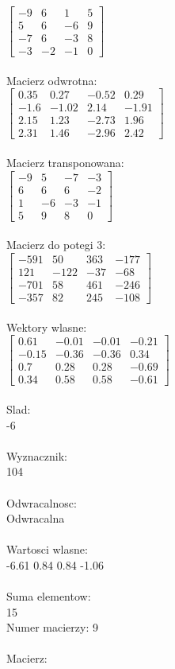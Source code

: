 \documentclass[a4paper,12pt]{article}
\begin{document}
$\begin{bmatrix} -9&6&1&5\\5&6&-6&9\\-7&6&-3&8\\-3&-2&-1&0 \end{bmatrix}$
\\
\\
Macierz odwrotna:\\

$\begin{bmatrix} 0.35&0.27&-0.52&0.29\\-1.6&-1.02&2.14&-1.91\\2.15&1.23&-2.73&1.96\\2.31&1.46&-2.96&2.42 \end{bmatrix}$
\\
\\
Macierz transponowana:\\

$\begin{bmatrix} -9&5&-7&-3\\6&6&6&-2\\1&-6&-3&-1\\5&9&8&0 \end{bmatrix}$
\\
\\
Macierz do potegi 3:\\

$\begin{bmatrix} -591&50&363&-177\\121&-122&-37&-68\\-701&58&461&-246\\-357&82&245&-108 \end{bmatrix}$
\\
\\
Wektory wlasne:\\

$\begin{bmatrix} 0.61&-0.01&-0.01&-0.21\\-0.15&-0.36&-0.36&0.34\\0.7&0.28&0.28&-0.69\\0.34&0.58&0.58&-0.61 \end{bmatrix}$
\\
\\
Slad:\\
-6
\\
\\
Wyznacznik:\\
104
\\
\\
Odwracalnosc:\\
Odwracalna
\\
\\
Wartosci wlasne:\\
-6.61 0.84 0.84 -1.06
\\
\\
Suma elementow:\\
15
\\
\newpage
Numer macierzy:
9
\\
\\
Macierz:\\
\end{document}
